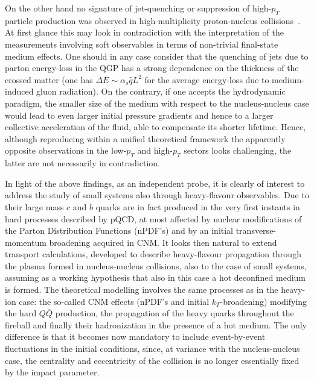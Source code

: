 On the other hand no signature of jet-quenching or suppression of high-$p_T$ particle production was observed in high-multiplicity proton-nucleus collisions~\cite{Acharya:2018qsh}.  At first glance this may look in contradiction with the interpretation of the  measurements involving soft observables in terms of non-trivial final-state medium effects. One should in any case consider that the quenching of jets due to parton energy-loss in the QGP has a strong dependence on the thickness of the crossed matter (one has $\Delta E\sim \alpha_s\hat q L^2$ for the average energy-loss due to medium-induced gluon radiation). On the contrary, if one accepts the hydrodynamic paradigm, the smaller size of the medium with respect to the nucleus-nucleus case would lead to even larger initial pressure gradients and hence to a larger collective acceleration of the fluid, able to compensate its shorter lifetime. Hence, although reproducing within a unified theoretical framework the apparently opposite observations in the low-$p_T$ and high-$p_T$ sectors looks challenging, the latter are not necessarily in contradiction.

In light of the above findings, as an independent probe, it is clearly of interest to address the study of small systems also through heavy-flavour observables. Due to their large mass $c$ and $b$ quarks are in fact produced in the very first instants in hard processes described by pQCD, at most affected by nuclear modifications of the Parton Distribution Functions (nPDF's) and by an initial transverse-momentum broadening acquired in CNM. %
It looks then natural to extend transport calculations, developed to describe heavy-flavour propagation through the plasma formed in nucleus-nucleus collisions, also to the case of small systems, assuming as a working hypothesis that also in this case a hot deconfined medium is formed. The theoretical modelling involves the same processes as in the heavy-ion case: the so-called CNM effects (nPDF's and initial $k_T$-broadening) modifying the hard $Q\overline{Q}$ production, the propagation of the heavy quarks throughout the fireball and finally their hadronization in the presence of a hot medium. The only difference is that it becomes now mandatory to include event-by-event fluctuations in the initial conditions, since, at variance with the nucleus-nucleus case, the centrality and eccentricity of the collision is no longer essentially fixed by the impact parameter. 

